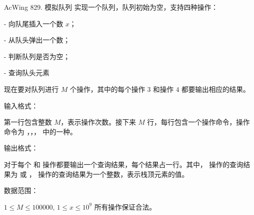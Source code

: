\begin{titledbox}{AcWing 829. 模拟队列}
    实现一个队列，队列初始为空，支持四种操作：

    \begin{myenum}
        \item {} - 向队尾插入一个数 $x$；
        \item {} - 从队头弹出一个数；
        \item {} - 判断队列是否为空；
        \item {} - 查询队头元素
    \end{myenum}

    现在要对队列进行 $M$ 个操作，其中的每个操作 $3$ 和操作 $4$ 都要输出相应的结果。

    输入格式：

    第一行包含整数 $M$，表示操作次数。接下来 $M$ 行，每行包含一个操作命令，操作命令为 ，，， 中的一种。

    输出格式：

    对于每个  和  操作都要输出一个查询结果，每个结果占一行。其中， 操作的查询结果为  或 ， 操作的查询结果为一个整数，表示栈顶元素的值。

    数据范围：

    $1 \le M \le 100000$, $1 \le x \le 10^9$ 所有操作保证合法。

    \begin{inputblock}
         \\
         \\
         \\
         \\
         \\
         \\
         \\
         \\
         \\
         \\
    \end{inputblock}
    \begin{outputblock}
         \\
         \\
         \\
    \end{outputblock}
\end{titledbox}

